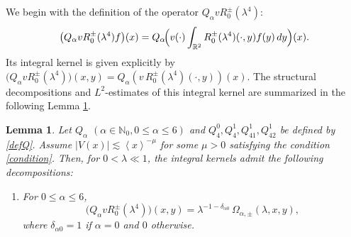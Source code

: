 \documentclass[reqno]{amsart}
\newtheorem{lemma}[theorem]{Lemma}
\numberwithin{equation}{section}
\begin{document}
We begin with the definition of the operator $Q_\alpha v R_0^\pm(\lambda^4)$:
\[
\bigl(Q_\alpha v R_0^\pm(\lambda^4) f\bigr)(x) = Q_\alpha\!\Bigl( v(\cdot) \int_{\mathbb{R}^2} R_0^\pm(\lambda^4)(\cdot, y) f(y) \, dy \Bigr)(x).
\]
Its integral kernel is given explicitly by
\(
\bigl(Q_\alpha v R_0^\pm(\lambda^4)\bigr)(x, y) = Q_\alpha\!\left( v\, R_0^\pm(\lambda^4)(\cdot, y) \right)(x).
\)
The structural decompositions and $L^2$-estimates of this integral kernel are summarized in the following Lemma \ref{lemma_projection}.

\begin{lemma}\label{lemma_projection}
	Let $Q_\alpha$ $(\alpha\in\mathbb{N}_0, 0\le\alpha\le6)$ and $Q_4^0, Q_4^1, Q_{41}^1, Q_{42}^1$ be defined by \eqref{defQ}. Assume $\left|V(x)\right| \lesssim \left \langle  x\right \rangle^{-\mu}$ for some $\mu>0$ satisfying the condition \eqref{condition}. Then, for $0<\lambda\ll1$, the integral kernels admit the following decompositions:
	\begin{enumerate}
		\item[(i)] For $0\le\alpha\le6$,
		\[
		\bigl(Q_\alpha v R_0^\pm(\lambda^4)\bigr)(x,y)=\lambda^{-1-\delta_{\alpha0}}\,\Omega_{\alpha,\pm}(\lambda,x,y),
		\]
		where $\delta_{\alpha0}=1$ if $\alpha=0$ and $0$ otherwise.
		

\end{enumerate}
\end{lemma}
\end{document}
